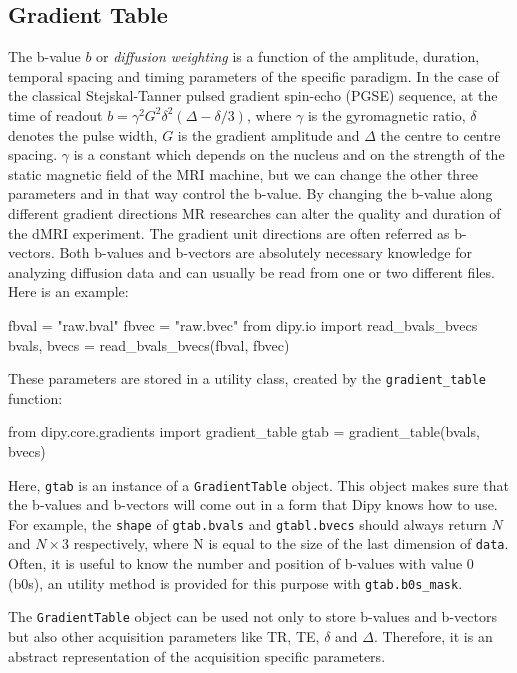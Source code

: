 \documentclass{bioinfo}
\begin{document}
\subsection{Gradient Table}\label{gtab}
The b-value $b$ or \emph{diffusion weighting} is a function of the amplitude,
duration, temporal spacing and timing parameters of the specific paradigm. In
the case of the classical Stejskal-Tanner pulsed gradient spin-echo (PGSE)
sequence, at the time of readout
$b=\gamma^{2}G^{2}\delta^{2}\left(\Delta-\delta/3 \right)$, where $\gamma$ is
the gyromagnetic ratio, $\delta$ denotes the pulse width, $G$ is the gradient
amplitude and $\Delta$ the centre to centre spacing. $\gamma$ is a constant
which depends on the nucleus and on the strength of the static magnetic field
of the MRI machine, but we can change the other three parameters and
in that way control the b-value. By changing the b-value along different
gradient directions MR researches can alter the quality and duration of
the dMRI experiment. The gradient unit directions are often referred as
b-vectors. Both b-values and b-vectors are absolutely necessary knowledge for
analyzing diffusion data and can usually be read from one or two different
files. Here is an example:
\begin{python}
fbval = "raw.bval"
fbvec = "raw.bvec"
from dipy.io import read_bvals_bvecs
bvals, bvecs = read_bvals_bvecs(fbval, fbvec)
\end{python}
These parameters are stored in a utility class, created by the \texttt{gradient\_table} function:
\begin{python}
from dipy.core.gradients import gradient_table
gtab = gradient_table(bvals, bvecs)
\end{python}
Here, \texttt{gtab} is an instance of a \texttt{GradientTable} object. This
object makes sure that the b-values and b-vectors will come out in a form that
Dipy knows how to use. For example, the \texttt{shape} of
\texttt{gtab.bvals} and \texttt{gtabl.bvecs} should always return $N$ and
$N\times3$ respectively, where N is equal to the size of the last dimension of
\texttt{data}. Often, it is useful to know the number and position of b-values
with value 0 (b0s), an utility method is provided for this purpose with
\texttt{gtab.b0s\_mask}.

The \texttt{GradientTable} object can be used not only to store b-values and
b-vectors but also other acquisition parameters like TR, TE, $\delta$ and
$\Delta$. Therefore, it is an abstract representation of the acquisition
specific parameters.
\end{document}
